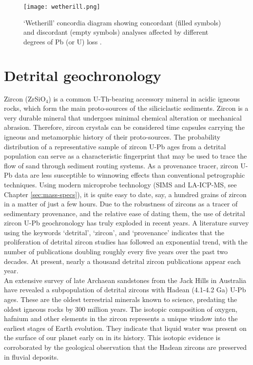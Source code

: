 \documentclass{book}
\newif\ifpdf
\begin{document}
\begin{figure}[!ht]
  \centering
  \ifpdf
  \def\svgwidth{.7\textwidth}
  
  \else
  \texttt{[image: wetherill.png]}
  \fi
  \caption{`Wetherill' concordia diagram showing concordant (filled
    symbols) and discordant (empty symbols) analyses affected by
    different degrees of Pb (or U) loss \citep[modified
      from][]{allegre2008}.}
  \label{fig:wetherill}
\end{figure}

\section{Detrital geochronology}

Zircon (ZrSiO$_4$) is a common U-Th-bearing accessory mineral in
acidic igneous rocks, which form the main proto-sources of the
siliciclastic sediments. Zircon is a very durable mineral that
undergoes minimal chemical alteration or mechanical
abrasion. Therefore, zircon crystals can be considered time capsules
carrying the igneous and metamorphic history of their
proto-sources. The probability distribution of a representative sample
of zircon U-Pb ages from a detrital population can serve as a
characteristic fingerprint that may be used to trace the flow of sand
through sediment routing systems. As a provenance tracer, zircon U-Pb
data are less susceptible to winnowing effects than conventional
petrographic techniques. Using modern microprobe technology (SIMS and
LA-ICP-MS, see Chapter \ref{sec:mass-specs}), it is quite easy to
date, say, a hundred grains of zircon in a matter of just a few
hours. Due to the robustness of zircons as a tracer of sedimentary
provenance, and the relative ease of dating them, the use of detrital
zircon U-Pb geochronology has truly exploded in recent years. A
literature survey using the keywords `detrital', `zircon', and
`provenance' indicates that the proliferation of detrital zircon
studies has followed an exponential trend, with the number of
publications doubling roughly every five years over the past two
decades. At present, nearly a thousand detrital zircon publications
appear each year.\\

An extensive survey of late Archaean sandstones from the Jack Hills in
Australia have revealed a subpopulation of detrital zircons with
Hadean (4.1-4.2 Ga) U-Pb ages. These are the oldest terrestrial
minerals known to science, predating the oldest igneous rocks by 300
million years.  The isotopic composition of oxygen, hafnium and other
elements in the zircon represents a unique window into the earliest
stages of Earth evolution.  They indicate that liquid water was
present on the surface of our planet early on in its history. This
isotopic evidence is corroborated by the geological observation that
the Hadean zircons are preserved in fluvial deposits.
\end{document}

